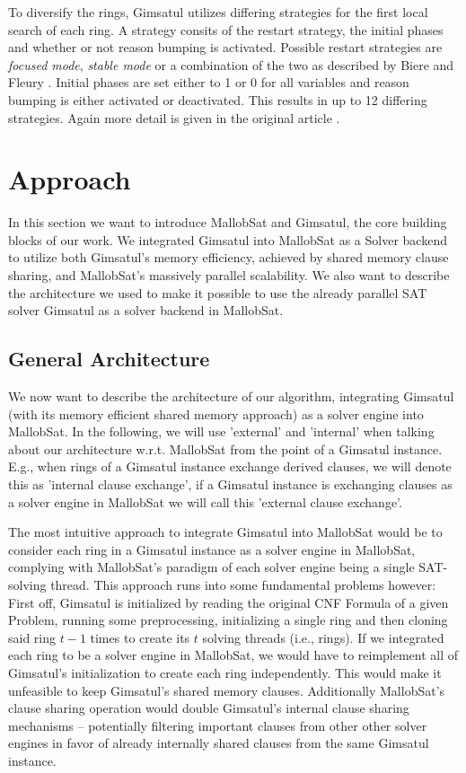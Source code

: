 \documentclass[12pt,a4paper,twoside]{scrartcl}
\numberwithin{equation}{section}
\begin{document}
To diversify the rings, Gimsatul utilizes differing strategies for the first local search of each ring. A strategy consits of the restart strategy, the initial phases and whether or not reason bumping is activated. Possible restart strategies are \textit{focused mode}, \textit{stable mode} or a combination of the two as described by Biere and Fleury \cite{restartStrategy}. Initial phases are set either to 1 or 0 for all variables and reason bumping is either activated or deactivated. This results in up to 12 differing strategies. Again more detail is given in the original article \cite{gimsatul}.


\newpage
\section{Approach}
\label{sec:approach}

In this section we want to introduce MallobSat and Gimsatul, the core building blocks of our work. We integrated Gimsatul into MallobSat as a Solver backend to utilize both Gimsatul's memory efficiency, achieved by shared memory clause sharing, and MallobSat's massively parallel scalability. We also want to describe the architecture we used to make it possible to use the already parallel SAT solver Gimsatul as a solver backend in MallobSat.

\subsection{General Architecture}

We now want to describe the architecture of our algorithm, integrating Gimsatul (with its memory efficient shared memory approach) as a solver engine into MallobSat. In the following, we will use 'external' and 'internal' when talking about our architecture w.r.t. MallobSat from the point of a Gimsatul instance. E.g., when rings of a Gimsatul instance exchange derived clauses, we will denote this as 'internal clause exchange', if a Gimsatul instance is exchanging clauses as a solver engine in MallobSat we will call this 'external clause exchange'.

The most intuitive approach to integrate Gimsatul into MallobSat would be to consider each ring in a Gimsatul instance as a solver engine in MallobSat, complying with MallobSat's paradigm of each solver engine being a single SAT-solving thread. This approach runs into some fundamental problems however: 
First off, Gimsatul is initialized by reading the original CNF Formula of a given Problem, running some preprocessing, initializing a single ring and then cloning said ring $t - 1$ times to create its $t$ solving threads (i.e., rings). If we integrated each ring to be a solver engine in MallobSat, we would have to reimplement all of Gimsatul's initialization to create each ring independently. This would make it unfeasible to keep Gimsatul's shared memory clauses. Additionally MallobSat's clause sharing operation would double Gimsatul's internal clause sharing mechanisms -- potentially filtering important clauses from other other solver engines in favor of already internally shared clauses from the same Gimsatul instance.
\end{document}
